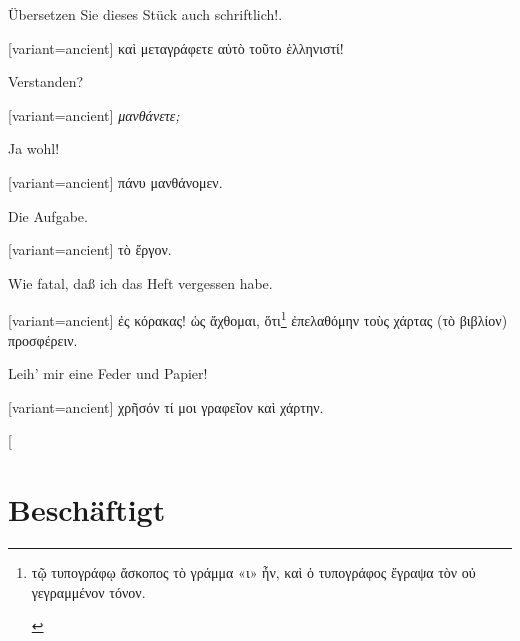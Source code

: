 Übersetzen Sie dieses Stück auch schriftlich!.

\switchcolumn

\begin{greek}[variant=ancient]%
καὶ μεταγράφετε αὐτὸ τοῦτο ἑλληνιστί!

\end{greek}%
\switchcolumn*

Verstanden?

\switchcolumn

\begin{greek}[variant=ancient]%
\emph{μανθάνετε;}

\end{greek}%
\switchcolumn*

Ja wohl!

\switchcolumn

\begin{greek}[variant=ancient]%
πάνυ μανθάνομεν.

\end{greek}%
\switchcolumn*

Die Aufgabe.

\switchcolumn

\begin{greek}[variant=ancient]%
τὸ ἔργον.

\end{greek}%
\switchcolumn*

Wie fatal, daß ich das Heft vergessen habe.

\switchcolumn

\begin{greek}[variant=ancient]%
ἐς κόρακας! ὡς ἄχθομαι, ὅτι\footnote{\begin{latin}%
\textgreek[variant=ancient]{τῷ τυπογράφῳ ἄσκοπος τὸ γράμμα «ι» ἦν,
καὶ ὁ τυπογράφος ἔγραψα τὸν οὐ γεγραμμένον τόνον.}\end{latin}%
} ἐπελαθόμην τοὺς χάρτας (τὸ βιβλίον) προσφέρειν.

\end{greek}%
\switchcolumn*

Leih' mir eine Feder und Papier!

\switchcolumn

\begin{greek}[variant=ancient]%
χρῆσόν τί μοι γραφεῖον καὶ χάρτην.

\end{greek}%
\switchcolumn*[


\section{Beschäftigt}

